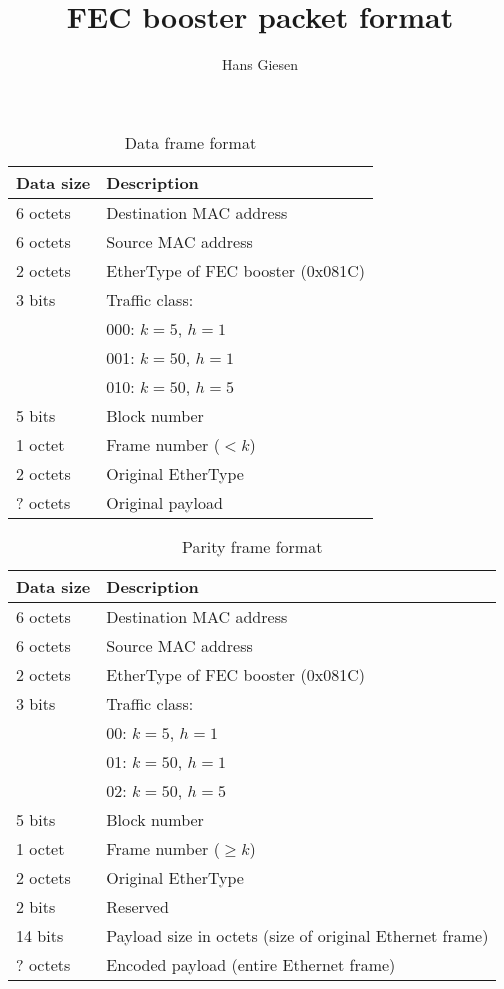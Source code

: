 \documentclass{article}
\begin{document}
  \title{FEC booster packet format}

  \author{Hans Giesen}

  \maketitle  

  \begin{table}
    \begin{tabular}{l l}
      \toprule
        Data size & Description \\
      \midrule
        6 octets & Destination MAC address \\
        6 octets & Source MAC address \\
        2 octets & EtherType of FEC booster (0x081C) \\
        3 bits & Traffic class: \\
               & 000: $k = 5$, $h = 1$ \\
               & 001: $k = 50$, $h = 1$ \\
               & 010: $k = 50$, $h = 5$ \\
        5 bits & Block number \\
        1 octet & Frame number ($< k$) \\
        2 octets & Original EtherType \\
        ? octets & Original payload \\
      \bottomrule
    \end{tabular}
    \caption{Data frame format}
  \end{table}

  \begin{table}
    \begin{tabular}{l l}
      \toprule
        Data size & Description \\
      \midrule
        6 octets & Destination MAC address \\
        6 octets & Source MAC address \\
        2 octets & EtherType of FEC booster (0x081C) \\
        3 bits & Traffic class: \\
               & 00: $k = 5$, $h = 1$ \\
               & 01: $k = 50$, $h = 1$ \\
               & 02: $k = 50$, $h = 5$ \\
        5 bits & Block number \\
        1 octet & Frame number ($\ge k$) \\
        2 octets & Original EtherType \\
	2 bits & Reserved \\
        14 bits & Payload size in octets (size of original Ethernet frame) \\
        ? octets & Encoded payload (entire Ethernet frame) \\
      \bottomrule
    \end{tabular}
    \caption{Parity frame format}
  \end{table}
\end{document}
